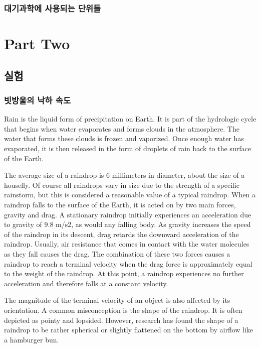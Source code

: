 \section{대기과학에 사용되는 단위들}



\part{Part Two}



\chapter{실험}

\section{빗방울의 낙하 속도}

Rain is the liquid form of precipitation on Earth. It is part of the hydrologic cycle that begins when water evaporates and forms clouds in the atmosphere. The water that forms these clouds is frozen and vaporized. Once enough water has evaporated, it is then released in the form of droplets of rain back to the surface of the Earth.

The average size of a raindrop is 6 millimeters in diameter, about the size of a housefly. Of course all raindrops vary in size due to the strength of a specific rainstorm, but this is considered a reasonable value of a typical raindrop. When a raindrop falls to the surface of the Earth, it is acted on by two main forces, gravity and drag. A stationary raindrop initially experiences an acceleration due to gravity of 9.8 m/s2, as would any falling body. As gravity increases the speed of the raindrop in its descent, drag retards the downward acceleration of the raindrop. Usually, air resistance that comes in contact with the water molecules as they fall causes the drag. The combination of these two forces causes a raindrop to reach a terminal velocity when the drag force is approximately equal to the weight of the raindrop. At this point, a raindrop experiences no further acceleration and therefore falls at a constant velocity.

The magnitude of the terminal velocity of an object is also affected by its orientation. A common misconception is the shape of the raindrop. It is often depicted as pointy and lopsided. However, research has found the shape of a raindrop to be rather spherical or slightly flattened on the bottom by airflow like a hamburger bun.

